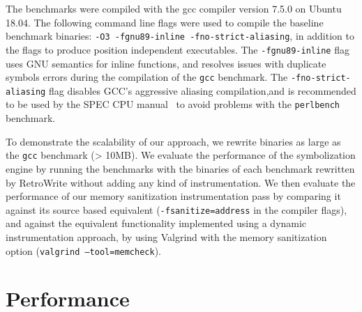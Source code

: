 \documentclass[a4paper,11pt,oneside]{report}
\newcommand{\sysname}{RetroWrite\xspace}
\begin{document}
The benchmarks were compiled with the gcc compiler version 7.5.0 on Ubuntu
18.04. The following command line flags were used to compile the baseline
benchmark binaries: \texttt{-O3 -fgnu89-inline -fno-strict-aliasing}, in
addition to the flags to produce position independent executables. 
The \texttt{-fgnu89-inline} flag uses GNU semantics for inline functions, and
resolves issues with duplicate symbols errors during the compilation of the
\texttt{gcc} benchmark.  The \texttt{-fno-strict-aliasing} flag disables GCC's
aggressive aliasing compilation,and is recommended to be used by the SPEC CPU
manual~\cite{specaliasing} to avoid problems with the \texttt{perlbench}
benchmark. 

To demonstrate the scalability of our approach, we rewrite binaries as large as
the \texttt{gcc} benchmark (> 10MB).  We evaluate the performance of the
symbolization engine by running the benchmarks with the binaries of each
benchmark rewritten by \sysname without adding any kind of instrumentation. We
then evaluate the performance of our memory sanitization instrumentation pass
by comparing it against its source based equivalent
(\texttt{-fsanitize=address} in the compiler flags), and against the equivalent
functionality implemented using a dynamic instrumentation approach, by using
Valgrind with the memory sanitization option (\texttt{valgrind
--tool=memcheck}).


\section{Performance}


\end{document}
